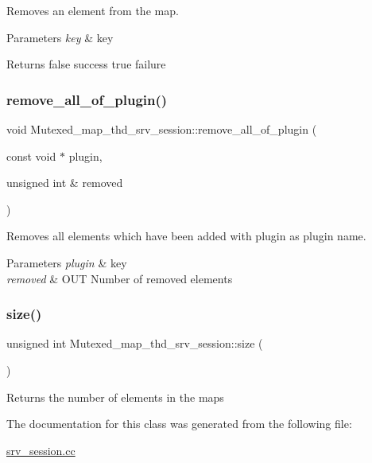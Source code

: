 Removes an element from the map.


\begin{DoxyParams}{Parameters}
{\em key} & key\\
\hline
\end{DoxyParams}
\begin{DoxyReturn}{Returns}
false success true failure 
\end{DoxyReturn}
\mbox{\label{classMutexed__map__thd__srv__session_a0645d00fbc8ef1d71612e0391c9029f9}} 
\subsubsection{\texorpdfstring{remove\+\_\+all\+\_\+of\+\_\+plugin()}{remove\_all\_of\_plugin()}}
{\footnotesize\ttfamily void Mutexed\+\_\+map\+\_\+thd\+\_\+srv\+\_\+session\+::remove\+\_\+all\+\_\+of\+\_\+plugin (\begin{DoxyParamCaption}\item[{const void $\ast$}]{plugin,  }\item[{unsigned int \&}]{removed }\end{DoxyParamCaption})\hspace{0.3cm}{\ttfamily [inline]}}

Removes all elements which have been added with plugin as plugin name.


\begin{DoxyParams}{Parameters}
{\em plugin} & key \\
\hline
{\em removed} & O\+UT Number of removed elements \\
\hline
\end{DoxyParams}
\mbox{\label{classMutexed__map__thd__srv__session_a377c0a20e7dff0d814d39e904ff5d41b}} 
\subsubsection{\texorpdfstring{size()}{size()}}
{\footnotesize\ttfamily unsigned int Mutexed\+\_\+map\+\_\+thd\+\_\+srv\+\_\+session\+::size (\begin{DoxyParamCaption}{ }\end{DoxyParamCaption})\hspace{0.3cm}{\ttfamily [inline]}}

Returns the number of elements in the maps 

The documentation for this class was generated from the following file\+:\begin{DoxyCompactItemize}
\item 
\mbox{\hyperlink{srv__session_8cc}{srv\+\_\+session.\+cc}}\end{DoxyCompactItemize}
